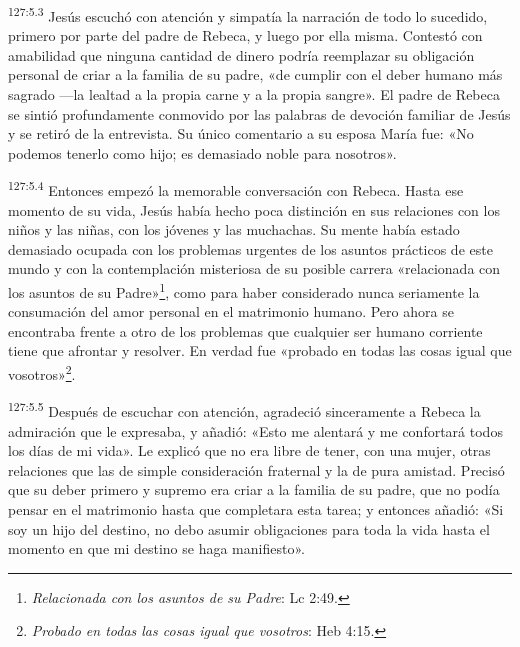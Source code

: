 \par 
\textsuperscript{127:5.3} Jesús escuchó con atención y simpatía la narración de todo lo sucedido, primero por parte del padre de Rebeca, y luego por ella misma. Contestó con amabilidad que ninguna cantidad de dinero podría reemplazar su obligación personal de criar a la familia de su padre, «de cumplir con el deber humano más sagrado ---la lealtad a la propia carne y a la propia sangre». El padre de Rebeca se sintió profundamente conmovido por las palabras de devoción familiar de Jesús y se retiró de la entrevista. Su único comentario a su esposa María fue: «No podemos tenerlo como hijo; es demasiado noble para nosotros».

\par 
\textsuperscript{127:5.4} Entonces empezó la memorable conversación con Rebeca. Hasta ese momento de su vida, Jesús había hecho poca distinción en sus relaciones con los niños y las niñas, con los jóvenes y las muchachas. Su mente había estado demasiado ocupada con los problemas urgentes de los asuntos prácticos de este mundo y con la contemplación misteriosa de su posible carrera «relacionada con los asuntos de su Padre»\footnote{\textit{Relacionada con los asuntos de su Padre}: Lc 2:49.}, como para haber considerado nunca seriamente la consumación del amor personal en el matrimonio humano. Pero ahora se encontraba frente a otro de los problemas que cualquier ser humano corriente tiene que afrontar y resolver. En verdad fue «probado en todas las cosas igual que vosotros»\footnote{\textit{Probado en todas las cosas igual que vosotros}: Heb 4:15.}.

\par 
\textsuperscript{127:5.5} Después de escuchar con atención, agradeció sinceramente a Rebeca la admiración que le expresaba, y añadió: «Esto me alentará y me confortará todos los días de mi vida». Le explicó que no era libre de tener, con una mujer, otras relaciones que las de simple consideración fraternal y la de pura amistad. Precisó que su deber primero y supremo era criar a la familia de su padre, que no podía pensar en el matrimonio hasta que completara esta tarea; y entonces añadió: «Si soy un hijo del destino, no debo asumir obligaciones para toda la vida hasta el momento en que mi destino se haga manifiesto».

